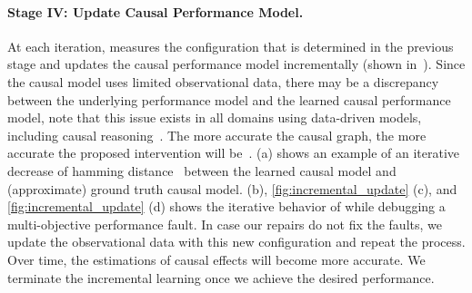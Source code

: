 






\paragraph{Stage IV: Update Causal Performance Model.}
\label{sect:incremental_learning}



At each iteration, \ourapproach measures the configuration that is determined in the previous stage and updates the causal performance model incrementally (shown in~). 
Since the causal model uses limited observational data, there may be a discrepancy between the underlying performance model and the learned causal performance model, note that this issue exists in all domains using data-driven models, including causal reasoning~\cite{pearl2009causality}. The more accurate the causal graph, the more accurate the proposed intervention will be~\cite{spirtes2000causation,ogarrio2016hybrid, glymour2019review,colombo2012learning,colombo2014order}.  (a) shows an example of an iterative decrease of hamming distance~\cite{norouzi2012hamming} between the learned causal model and (approximate) ground truth causal model.  (b), \ref{fig:incremental_update} (c), and \ref{fig:incremental_update} (d) shows the iterative behavior of \ourapproach while debugging a multi-objective performance fault. In case our repairs do not fix the faults, we update the observational data with this new configuration and repeat the process. Over time, the estimations of causal effects will become more accurate. We terminate the incremental learning once we achieve the desired performance.

